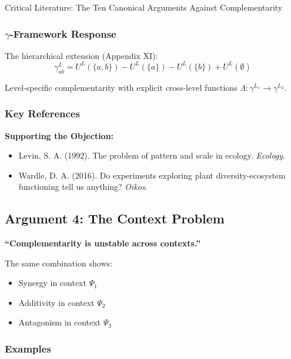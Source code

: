 \begin{chapter}{Critical Literature: The Ten Canonical Arguments Against Complementarity}
\subsubsection{$\gamma$-Framework Response}

The hierarchical extension (Appendix XI):
\[
\gamma^L_{ab} = U^L(\{a,b\}) - U^L(\{a\}) - U^L(\{b\}) + U^L(\emptyset)
\]

Level-specific complementarity with explicit cross-level functions $\Lambda: \gamma^{L_1} \to \gamma^{L_2}$.

\subsubsection{Key References}

\textbf{Supporting the Objection:}
\begin{itemize}[noitemsep]
    \item Levin, S. A. (1992). The problem of pattern and scale in ecology. \textit{Ecology}.
    \item Wardle, D. A. (2016). Do experiments exploring plant diversity-ecosystem functioning tell us anything? \textit{Oikos}.
\end{itemize}

\subsection{Argument 4: The Context Problem}
\label{sec:arg-context}

\begin{tcolorbox}[colback=red!5!white,colframe=red!75!black,title=\textbf{Core Claim}]
\textbf{``Complementarity is unstable across contexts.''}

The same combination shows:
\begin{itemize}[noitemsep]
    \item Synergy in context $\Psi_1$
    \item Additivity in context $\Psi_2$
    \item Antagonism in context $\Psi_3$
\end{itemize}
\end{tcolorbox}

\subsubsection{Examples}


\end{chapter}
